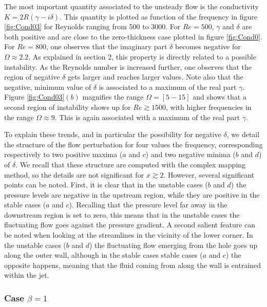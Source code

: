 \documentclass{jfm}
\begin{document}
The most important quantity associated to the unsteady flow is the conductivity $K = 2R (\gamma-i \delta)$. This quantity is plotted as function of the frequency in figure \ref{fig:Cond03} for Reynolds ranging from 500 to 3000.
For $Re = 500$, $\gamma$ and $\delta$ are both positive and are close to the zero-thickness case plotted in figure \ref{fig:Cond0}. For $Re= 800$, one observes that the imaginary part $\delta$ becomes negative for 
$\Omega \approx 2.2$. As explained in section 2, this property is directly related to a possible instability. As the Reynolds number is increased further, one observes that the region of negative $\delta$ gets larger and reaches larger values. Note also that the negative, minimum value of $\delta$ is associated to a maximum of the real part $\gamma$. 
Figure \ref{fig:Cond03}$(b)$ magnifies the range $\Omega = [5-15]$ and shows that a second region of instability shows up for $Re \gtrsim 1500$, with higher frequencies in the range $\Omega \approx 9$. This is again associated with a maximum of the real part $\gamma$.

To explain these trends, and in particular the possibility for negative $\delta$, we detail the structure of the flow perturbation for four values the frequency, corresponding respectively to two positive maxima ($a$ and $c$)
 and two negative minima  ($b$ and $d$) of $\delta$. We recall that these structure are computed with the complex mapping method, so the details are not significant for $x \gtrsim 2$. However, several significant points can be noted. First, it is clear that in the unstable cases ($b$ and $d$) the pressure levels are negative in the upstream region, while they are positive in the stable cases ($a$ and $c$). Recalling that the pressure level far away in the downstream region is set to zero, this means that in the unstable cases the fluctuating flow goes against the pressure gradient. A second salient feature can be noted when looking at the streamlines in the vicinity
 of the lower corner. In the unstable cases ($b$ and $d$) the fluctuating flow emerging from the hole goes up along the outer wall, although in the stable cases stable cases ($a$ and $c$) the opposite happens, meaning that the fluid coming from along the wall is entrained within the jet.


\subsubsection{Case $\beta = 1$}

\end{document}

